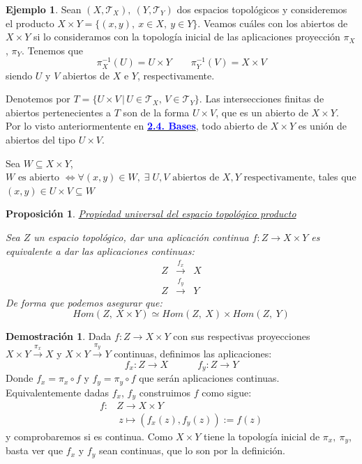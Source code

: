 \documentclass[12pt,twoside]{report}
\newcommand\mc[1]{\mathcal{#1}}
\theoremstyle{azul}
\theoremstyle{azul2}
\theoremstyle{plain}
\newtheorem*{prop}{Proposición}
\theoremstyle{definition}
\newtheorem*{eje}{Ejemplo}
\newtheorem*{dem}{Demostración}
\theoremstyle{remark}
\begin{document}
\begin{eje}
Sean $(X,\mc{T}_{X}),\: (Y,\mc{T}_Y)$ dos espacios topológicos y consideremos el producto $X \times Y = \{ (x,y), \: x \in X, \: y \in Y \}$. Veamos cuáles con los abiertos de $X \times Y$ si lo consideramos con la topología inicial de las aplicaciones proyección $\pi_{X}$, $\pi_{Y}$. Tenemos que
$$\pi^{-1}_X (U)=U \times Y \qquad \pi^{-1}_Y (V)=X \times V $$
siendo $U$ y $V$ abiertos de $X$ e $Y$, respectivamente.

Denotemos por $T=\{U\times V\,|\,U\in \mc{T}_X,\, V\in \mc{T}_Y\}$. Las intersecciones finitas de abiertos pertenecientes a $T$ son de la forma $U \times V$, que es un abierto de $X \times Y$. Por lo visto anteriormentente en \hyperref[sec:bases]{\textcolor{blue}{\textbf{2.4. Bases}}}, todo abierto de $X \times Y$ es unión de abiertos del tipo $U \times V$.

Sea $W \subseteq X\times Y$, $W \text{ es abierto } \Leftrightarrow \forall (x,y) \in W, \; \exists \; U, V \text{ abiertos de } X, Y \text{ respectivamente,}$ tales que $ (x,y) \in U \times V \subseteq W$
\end{eje}
\begin{prop}
\underline{Propiedad universal del espacio topológico producto}

Sea $Z$ un espacio topológico, dar una aplicación continua $f: Z \longrightarrow X \times Y$ es equivalente a dar las aplicaciones continuas:
$$\begin{array}{rcl}
      Z & \stackrel{f_x}{\longrightarrow} & X \\
      Z & \stackrel{f_y}{\longrightarrow} & Y
\end{array}$$
De forma que podemos asegurar que:
$$Hom(Z, \: X \times Y) \simeq Hom(Z, \: X) \times Hom(Z, \: Y )$$
\end{prop}
\begin{dem}
Dada $f: Z \longrightarrow X \times Y$ con sus respectivas proyecciones $X \times Y \stackrel{\pi_{x}}{\longrightarrow} X$ y $X \times Y \stackrel{\pi_y}{\longrightarrow} Y$ continuas, definimos las aplicaciones:
$$ f_x: Z \longrightarrow X \qquad \quad f_y: Z \longrightarrow Y $$
Donde $f_x=\pi_x \circ f$ y $f_y=\pi_y \circ f$ que serán aplicaciones continuas. Equivalentemente dadas $f_x$, $f_y$ construimos $f$ como sigue:
$$\begin{array}{rl}
     f : & Z \longrightarrow X \times Y  \\
        & \: z \longmapsto (f_x(z), f_y(z)):=f(z)
\end{array}$$
y comprobaremos si es continua. Como $X \times Y$ tiene la topología inicial de $\pi_x, \: \pi_y$, basta ver que $f_x$ y $f_y$ sean continuas, que lo son por la definición.
\end{dem}
\end{document}

